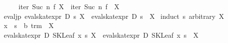 \begin{isabellebody}
\ \ \isamarkupfalse%
\ \isamarkupfalse%
\ {}iter\ {}Suc\ n{}\ f\ {}{}X{}\ {}\ {}iter\ {}Suc\ n{}\ f\ {}\ X{}\ \isamarkupfalse%
\isanewline
{}\isamarkupfalse%
%
\endisatagproof
{\isafoldproof}%
%
\isadelimproof
\isanewline
%
\endisadelimproof
\isanewline
{}\isamarkupfalse%
\ eval{}jp{}\ {}eval{}skat{}expr\ D\ s\ {}{}X{}\ {}\ {}{}eval{}skat{}expr\ D\ s\ {}\ X{}{}\isanewline
%
\isadelimproof
%
\endisadelimproof
%
\isatagproof
{}\isamarkupfalse%
\ {}induct\ s\ arbitrary{}\ X{}\isanewline
\ \ \isamarkupfalse%
\ x\ \ s\ {}{}\ {}{}b\ trm{}\ \ X\isanewline
\ \ \isamarkupfalse%
\ {}eval{}skat{}expr\ D\ {}SKLeaf\ x\ s{}\ {}{}X{}\ {}\ {}eval{}skat{}expr\ D\ {}SKLeaf\ x\ s{}\ {}\ X{}\isanewline

\end{isabellebody}
